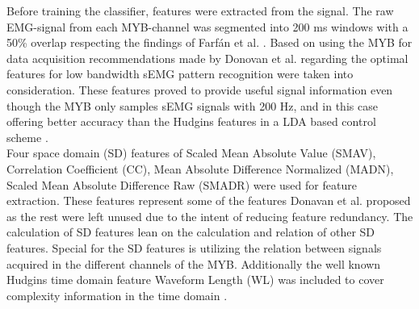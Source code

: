 	
Before training the classifier, features were extracted from the signal. The raw EMG-signal from each MYB-channel was segmented into 200 ms windows with a 50\% overlap respecting the findings of Farfán et al. \cite{Farfan2010}. Based on using the MYB for data acquisition recommendations made by Donovan et al. \cite{Donovan2017} regarding the optimal features for low bandwidth sEMG pattern recognition were taken into consideration. These features proved to provide useful signal information even though the MYB only samples sEMG signals with 200 Hz, and in this case offering better accuracy than the Hudgins features \cite{Hudgins1993} in a LDA based control scheme \cite{Donovan2017}. \\
Four space domain (SD) features of Scaled Mean Absolute Value (SMAV), Correlation Coefficient (CC), Mean Absolute Difference Normalized (MADN), Scaled Mean Absolute Difference Raw (SMADR) were used for feature extraction. These features represent some of the features Donavan et al. \cite{Donovan2017} proposed as the rest were left unused due to the intent of reducing feature redundancy. The calculation of SD features lean on the calculation and relation of other SD features. Special for the SD features is utilizing the relation between signals acquired in the different channels of the MYB. Additionally the well known Hudgins time domain feature Waveform Length (WL) was included to cover complexity information in the time domain \cite{Phiny2012}. %
